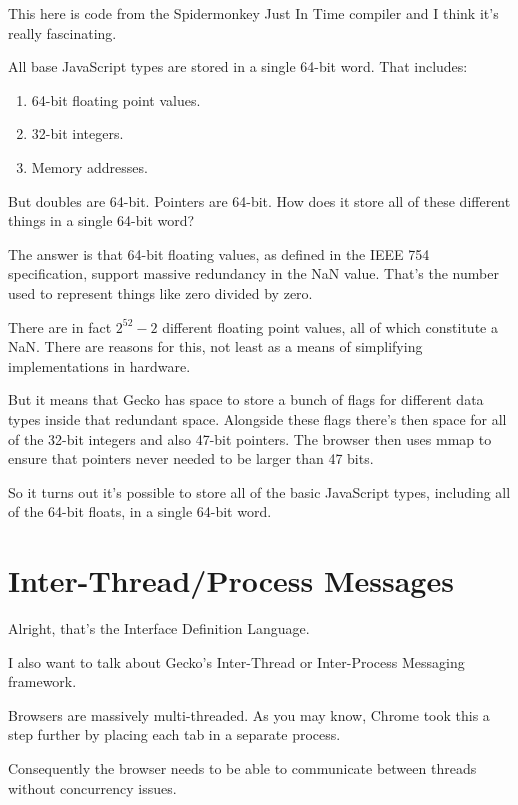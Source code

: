 \documentclass{article}
\begin{document}
This here is code from the Spidermonkey Just In Time compiler and I think it's really fascinating.

All base JavaScript types are stored in a single 64-bit word. That includes:

\begin{enumerate}
\item 64-bit floating point values.
\item 32-bit integers.
\item Memory addresses.
\end{enumerate}

But doubles are 64-bit. Pointers are 64-bit. How does it store all of these different things in a single 64-bit word?

The answer is that 64-bit floating values, as defined in the IEEE 754 specification, support massive redundancy in the NaN value. That's the number used to represent things like zero divided by zero.

There are in fact $2^{52} - 2$ different floating point values, all of which constitute a NaN. There are reasons for this, not least as a means of simplifying implementations in hardware.

But it means that Gecko has space to store a bunch of flags for different data types inside that redundant space. Alongside these flags there's then space for all of the 32-bit integers and also 47-bit pointers. The browser then uses mmap to ensure that pointers never needed to be larger than 47 bits.

So it turns out it's possible to store all of the basic JavaScript types, including all of the 64-bit floats, in a single 64-bit word.


\section{Inter-Thread/Process Messages}

Alright, that's the Interface Definition Language.

I also want to talk about Gecko's Inter-Thread or Inter-Process Messaging framework.

Browsers are massively multi-threaded. As you may know, Chrome took this a step further by placing each tab in a separate process.

Consequently the browser needs to be able to communicate between threads without concurrency issues.
\end{document}
